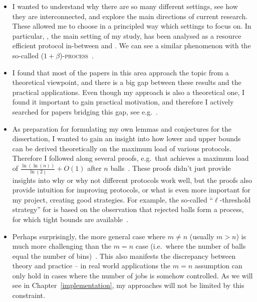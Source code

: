 \begin{itemize}
    \item 
    I wanted to understand why there are so many different settings, see how they are interconnected, and explore the main directions of current research. These allowed me to choose in a principled way which settings to focus on. In particular, \TwoThinning, the main setting of my study, has been analysed as a resource efficient protocol in-between \OneChoice and \TwoChoice. We can see a similar phenomenon with the so-called \textsc{($1+\beta$)-process}~\cite{peres2015oneplusbeta}.
    \item
    I found that most of the papers in this area approach the topic from a theoretical viewpoint, and there is a big gap between these results and the practical applications. Even though my approach is also a theoretical one, I found it important to gain practical motivation, and therefore I actively searched for papers bridging this gap, see e.g.~\cite{wang2017twochoicerouting}.
    \item
    As preparation for formulating my own lemmas and conjectures for the dissertation, I wanted to gain an insight into how lower and upper bounds can be derived theoretically on the maximum load of various protocols. Therefore I followed along several proofs, e.g.\ that \TwoChoice achieves a maximum load of $\frac{\ln(\ln(n))}{\ln(2)} + O(1)$ after $n$ balls~\cite{azar1999twochoice}. These proofs didn't just provide insights into why or why not different protocols work well, but the proofs also provide intuition for improving protocols, or what is even more important for my project, creating good strategies. For example, the so-called ``{$\ell$}-threshold strategy'' for \TwoThinning is based on the observation that rejected balls form a \OneChoice process, for which tight bounds are available~\cite{feldheim2021thinning}.
    \item
    Perhaps surprisingly, the more general case where $m\neq n$ (usually $m>n$) is much more challenging than the $m=n$ case (i.e.\ where the number of balls equal the number of bins)~\cite{berenbrink2006heavilyloaded}. This also manifests the discrepancy between theory and practice -- in real world applications the $m=n$ assumption can only hold in cases where the number of jobs is somehow controlled. As we will see in Chapter~\ref{implementation}, my approaches will not be limited by this constraint.

\end{itemize}
